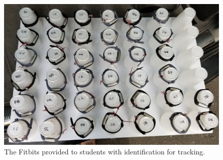 \begin{figure}
    \centering
    \includegraphics[width=\columnwidth]{figs/images/fitbits.jpg}
    \caption{The Fitbits provided to students with identification for tracking.}
    \label{fig:fitbits}
\end{figure}